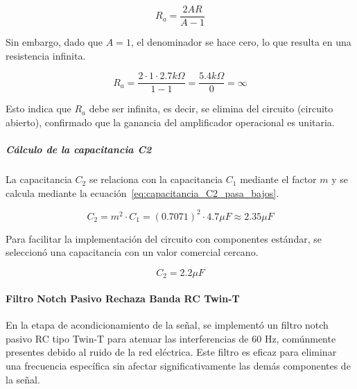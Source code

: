                     \begin{equation}
                        \label{eq:resistencia_Ra_pasa_bajos}
                        R_a = \frac{2AR}{A-1}
                    \end{equation}

                    Sin embargo, dado que $A = 1$, el denominador se hace cero, lo que resulta en una resistencia infinita. 

                    \begin{equation}
                        \label{eq:resistencia_Ra_pasa_bajos_valor}
                        R_a = \frac{2 \cdot 1 \cdot 2.7 k\Omega}{1 - 1} = \frac{5.4 k\Omega}{0} = \infty
                    \end{equation}

                    Esto indica que $R_a$ debe ser infinita, es decir, se elimina del circuito (circuito abierto), confirmado que la ganancia del amplificador operacional es unitaria.

                \subparagraph{Cálculo de la capacitancia C2}
                    La capacitancia $C_2$ se relaciona con la capacitancia $C_1$ mediante el factor $m$ y se calcula mediante la ecuación~\ref{eq:capacitancia_C2_pasa_bajos}.

                    \begin{equation}
                        \label{eq:capacitancia_C2_pasa_bajos}
                        C_2 = m^2 \cdot C_1 = (0.7071)^2 \cdot 4.7 \mu F \approx 2.35 \mu F
                    \end{equation}

                    Para facilitar la implementación del circuito con componentes estándar, se seleccionó una capacitancia con un valor comercial cercano.

                    \begin{equation}
                        C_2 = 2.2 \mu F
                    \end{equation}
            
            \paragraph{Filtro Notch Pasivo Rechaza Banda RC Twin-T}
                En la etapa de acondicionamiento de la señal, se implementó un filtro notch pasivo RC tipo Twin-T para atenuar las interferencias de 60 Hz, comúnmente presentes debido al ruido de la red eléctrica. Este filtro es eficaz para eliminar una frecuencia específica sin afectar significativamente las demás componentes de la señal.


